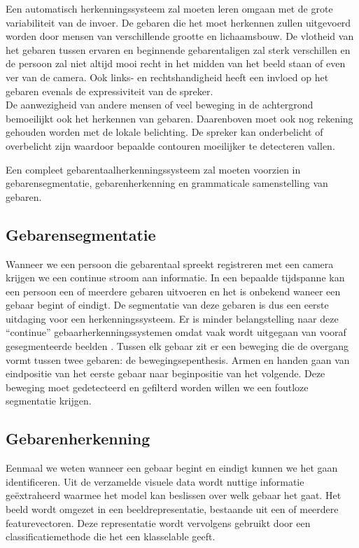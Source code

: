 \npar Een automatisch herkenningssysteem zal moeten leren omgaan met de grote variabiliteit van de invoer. De gebaren die het moet herkennen zullen uitgevoerd worden door mensen van verschillende grootte en lichaamsbouw. De vlotheid van het gebaren tussen ervaren en beginnende gebarentaligen zal sterk verschillen en de persoon zal niet altijd mooi recht in het midden van het beeld staan of even ver van de camera. Ook links- en rechtshandigheid heeft een invloed op het gebaren evenals de expressiviteit van de spreker.
\\ De aanwezigheid van andere mensen of veel beweging in de achtergrond bemoeilijkt ook het herkennen van gebaren. Daarenboven moet ook nog rekening gehouden worden met de lokale belichting. De spreker kan onderbelicht of overbelicht zijn waardoor bepaalde contouren moeilijker te detecteren vallen.

\npar Een compleet gebarentaalherkenningssysteem zal moeten voorzien in gebarensegmentatie, gebarenherkenning en grammaticale samenstelling van gebaren.

\subsection{Gebarensegmentatie}
\npar Wanneer we een persoon die gebarentaal spreekt registreren met een camera krijgen we een continue stroom aan informatie. In een bepaalde tijdspanne kan een persoon een of meerdere gebaren uitvoeren en het is onbekend waneer een gebaar begint of eindigt. De segmentatie van deze gebaren is dus een eerste uitdaging voor een herkenningssysteem. Er is minder belangstelling naar deze ``continue'' gebaarherkenningssystemen omdat vaak wordt uitgegaan van vooraf gesegmenteerde beelden \cite{hmdb-manual-segm}.
\npar  Tussen elk gebaar zit er een beweging die de overgang vormt tussen twee gebaren: de bewegingsepenthesis. Armen en handen gaan van eindpositie van het eerste gebaar naar beginpositie van het volgende. \cite{movement-epenthesis} Deze beweging moet gedetecteerd en gefilterd worden willen we een foutloze segmentatie krijgen.

\subsection{Gebarenherkenning}
Eenmaal we weten wanneer een gebaar begint en eindigt kunnen we het gaan identificeren. Uit de verzamelde visuele data wordt nuttige informatie ge\"extraheerd waarmee het model kan beslissen over welk gebaar het gaat. Het beeld wordt omgezet in een beeldrepresentatie, bestaande uit een of meerdere featurevectoren. Deze representatie wordt vervolgens gebruikt door een classificatiemethode die het een klasselable geeft.

